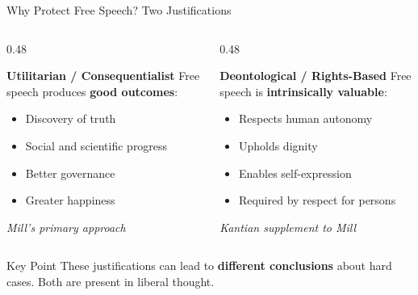 ﻿\documentclass[aspectratio=169,11pt]{beamer}
\begin{document}
\begin{frame}{Why Protect Free Speech? Two Justifications}
\begin{columns}[T]
\begin{column}{0.48\textwidth}
\begin{block}{\textbf{Utilitarian / Consequentialist}}
Free speech produces \textbf{good outcomes}:
\begin{itemize}
    \item Discovery of truth
    \item Social and scientific progress
    \item Better governance
    \item Greater happiness
\end{itemize}
\textit{Mill's primary approach}
\end{block}
\end{column}

\begin{column}{0.48\textwidth}
\begin{block}{\textbf{Deontological / Rights-Based}}
Free speech is \textbf{intrinsically valuable}:
\begin{itemize}
    \item Respects human autonomy
    \item Upholds dignity
    \item Enables self-expression
    \item Required by respect for persons
\end{itemize}
\textit{Kantian supplement to Mill}
\end{block}
\end{column}
\end{columns}

\vspace{0.4cm}
\begin{alertblock}{Key Point}
These justifications can lead to \textbf{different conclusions} about hard cases. Both are present in liberal thought.
\end{alertblock}
\end{frame}
\end{document}
